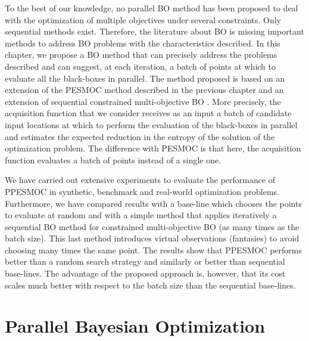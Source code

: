 To the best of our knowledge, no parallel BO method has been proposed to deal with the optimization of 
multiple objectives under several constraints. Only sequential methods exist. Therefore, the 
literature about BO is missing important methods to address BO problems with the characteristics described. 
In this chapter, we propose a BO method that can precisely address the problems described 
and can suggest, at each iteration, a batch of points at which to evaluate all the 
black-boxes in parallel. The method proposed is based on an extension of the PESMOC method
described in the previous chapter and an extension of sequential constrained 
multi-objective BO \citep{shah2015parallel}. More precisely, the acquisition function that we 
consider receives as an input a batch of candidate input locations at which to perform the evaluation
of the black-boxes in parallel and estimates the expected reduction in the entropy of the solution of 
the optimization problem. The difference with PESMOC is that here, the acquisition function evaluates
a batch of points instead of a single one. 

We have carried out extensive experiments to evaluate the performance of PPESMOC 
in synthetic, benchmark and real-world optimization problems. Furthermore, we have 
compared results with a base-line which chooses the points to evaluate at random 
and with a simple method that applies iteratively  a sequential BO method
for constrained multi-objective BO (as many times as the batch size). 
This last method introduces virtual observations (fantasies) to avoid choosing many times the same point.  
The results show that PPESMOC performs better than a random search strategy and 
similarly or better than sequential base-lines. The advantage of the proposed approach is, 
however, that its cost scales much better with respect to the batch size than the sequential base-lines.

\section{Parallel Bayesian Optimization}

